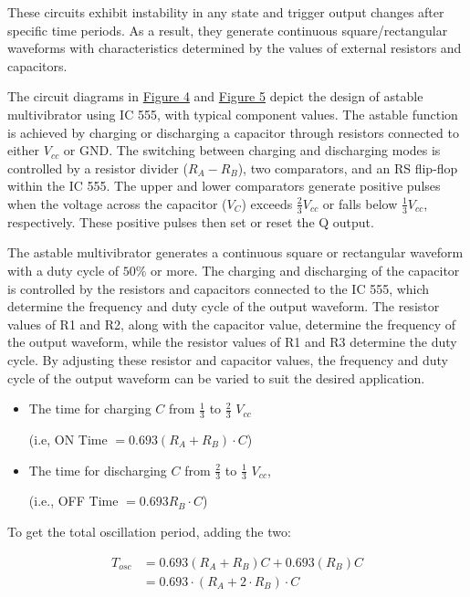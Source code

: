     These circuits exhibit instability in any state and trigger output changes after specific time periods. As a result, they generate continuous square/rectangular waveforms with characteristics determined by the values of external resistors and capacitors.

    The circuit diagrams in \hyperref[th:4]{Figure 4} and \hyperref[th:5]{Figure 5} depict the design of astable multivibrator using IC 555, with typical component values. The astable function is achieved by charging or discharging a capacitor through resistors connected to either $V_{cc}$ or GND. The switching between charging and discharging modes is controlled by a resistor divider ($R_A-R_B$), two comparators, and an RS flip-flop within the IC 555. The upper and lower comparators generate positive pulses when the voltage across the capacitor ($V_C$) exceeds $\frac{2}{3}V_{cc}$ or falls below $\frac{1}{3}V_{cc}$, respectively. These positive pulses then set or reset the Q output.

    The astable multivibrator generates a continuous square or rectangular waveform with a duty cycle of $50\%$ or more. The charging and discharging of the capacitor is controlled by the resistors and capacitors connected to the IC 555, which determine the frequency and duty cycle of the output waveform. The resistor values of R1 and R2, along with the capacitor value, determine the frequency of the output waveform, while the resistor values of R1 and R3 determine the duty cycle. By adjusting these resistor and capacitor values, the frequency and duty cycle of the output waveform can be varied to suit the desired application.\\

    \begin{itemize}
        \item The time for charging $C$ from $\frac{1}{3}$ to $\frac{2}{3}$ $V_{cc}$

        (i.e, ON Time $= 0.693 (R_A + R_B)\cdot C$)

        \item The time for discharging $C$ from $\frac{2}{3}$ to $\frac{1}{3}$ $V_{cc}$,
    
        (i.e., OFF Time $= 0.693 R_B\cdot C$)\\
    \end{itemize}

    To get the total oscillation period, adding the two:

        \begin{equation}
        \begin{split}
            T_{osc}& = 0.693(R_A+R_B)C + 0.693(R_B)C \\
            & =0.693 \cdot (R_A + 2\cdot R_B) \cdot C
        \end{split}
        \label{eq:1}
    \end{equation}

